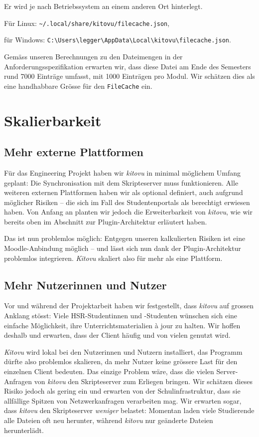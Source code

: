 \documentclass[a4paper]{article}
\let\oldsection\section
\renewcommand\section{\clearpage\oldsection}
\begin{document}
Er wird je nach Betriebssystem an einem anderen Ort hinterlegt. 

Für Linux: \verb|~/.local/share/kitovu/filecache.json|,

für Windows: \verb|C:\Users\legger\AppData\Local\kitovu\filecache.json|.

Gemäss unseren Berechnungen zu den Dateimengen in der Anforderungsspezifikation erwarten wir, dass diese Datei am Ende des Semesters rund 7000 Einträge umfasst, mit 1000 Einträgen pro Modul. Wir schätzen dies als eine handhabbare Grösse für den \verb|FileCache| ein.

\section{Skalierbarkeit}

\subsection{Mehr externe Plattformen}

Für das Engineering Projekt haben wir \emph{kitovu} in minimal möglichem Umfang geplant: Die Synchronisation mit dem Skripteserver muss funktionieren. Alle weiteren externen Plattformen haben wir als optional definiert, auch aufgrund möglicher Risiken -- die sich im Fall des Studentenportals als berechtigt erwiesen haben. Von Anfang an planten wir jedoch die Erweiterbarkeit von \emph{kitovu}, wie wir bereits oben im Abschnitt zur Plugin-Architektur erläutert haben. 

Das ist nun problemlos möglich: Entgegen unseren kalkulierten Risiken ist eine Moodle-Anbindung möglich -- und lässt sich nun dank der Plugin-Architektur problemlos integrieren. \emph{Kitovu} skaliert also für mehr als eine Plattform.


\subsection{Mehr Nutzerinnen und Nutzer}

Vor und während der Projektarbeit haben wir festgestellt, dass \emph{kitovu} auf grossen Anklang stösst: Viele HSR-Studentinnen und -Studenten wünschen sich eine einfache Möglichkeit, ihre Unterrichtsmaterialien à jour zu halten. Wir hoffen deshalb und erwarten, dass der Client häufig und von vielen genutzt wird.

\emph{Kitovu} wird lokal bei den Nutzerinnen und Nutzern installiert, das Programm dürfte also problemlos skalieren, da mehr Nutzer keine grössere Last für den einzelnen Client bedeuten. Das einzige Problem wäre, dass die vielen Server-Anfragen von \emph{kitovu} den Skripteserver zum Erliegen bringen. Wir schätzen dieses Risiko jedoch als gering ein und erwarten von der Schulinfrastruktur, dass sie allfällige Spitzen von Netzwerkanfragen verarbeiten mag. Wir erwarten sogar, dass  \emph{kitovu} den Skripteserver \emph{weniger} belastet: Momentan laden viele Studierende alle Dateien oft neu herunter, während \emph{kitovu} nur geänderte Dateien herunterlädt.
\end{document}
